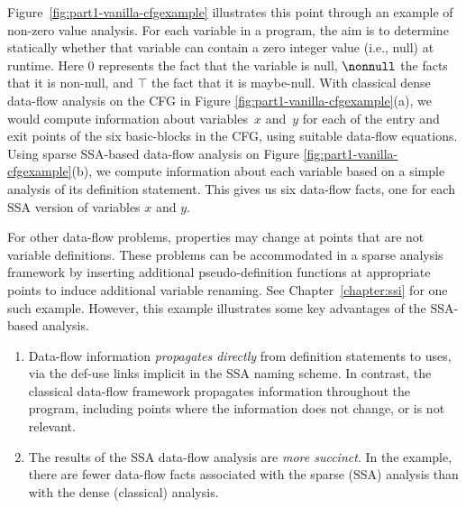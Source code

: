 Figure~\ref{fig:part1-vanilla-cfgexample} illustrates this point through an example of non-zero value analysis. For each variable in a program, the aim is to determine statically whether
that variable can contain a zero integer value (i.e., null) at runtime. Here $0$ represents the fact that the variable is null, $\nonnull$  the facts that it is non-null, and $\top$ the fact that it is maybe-null. 
With classical dense data-flow analysis on the CFG in Figure
\ref{fig:part1-vanilla-cfgexample}(a),
we would compute information about variables~$x$ and~$y$ for each of 
the entry and exit points of the six basic-blocks
in the CFG, using suitable data-flow equations.
Using sparse SSA-based data-flow analysis on Figure 
\ref{fig:part1-vanilla-cfgexample}(b),
we compute information about each variable based on a simple
analysis of its definition statement. This gives us six data-flow facts,
one for each SSA version of variables $x$ and $y$.

For other data-flow problems, properties may 
change at points that are not variable definitions.
These problems can be accommodated in a sparse analysis framework
by inserting additional pseudo-definition functions at appropriate 
points
to induce additional variable renaming. 
See Chapter~\ref{chapter:ssi}
for one such example.
%
However, this example illustrates some key advantages of the SSA-based analysis.
\begin{enumerate}
\item Data-flow information
\textit{propagates directly}
from definition statements to uses, via
the def-use links implicit in the SSA naming scheme. 
In contrast, the 
classical data-flow framework 
propagates information throughout the program,
including points where the information 
does not change, or is not relevant.
\item The results of the SSA data-flow analysis are
\textit{more succinct}.
In the example, there are fewer data-flow facts associated with
the sparse (SSA) analysis than with the dense (classical) analysis.
\end{enumerate}

